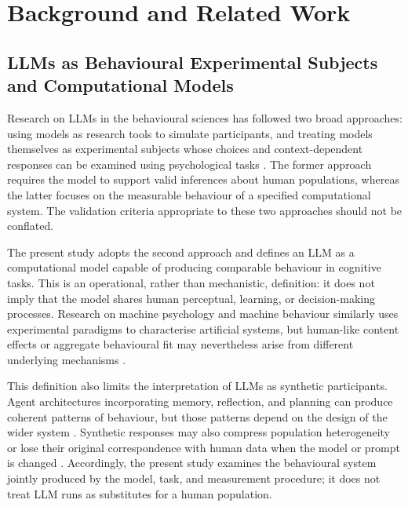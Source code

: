 \section{Background and Related Work}

\subsection{LLMs as Behavioural Experimental Subjects and Computational Models}

Research on LLMs in the behavioural sciences has followed two broad approaches: using models as research tools to simulate participants, and treating models themselves as experimental subjects whose choices and context-dependent responses can be examined using psychological tasks \cite{Dillion2023ReplaceParticipants,Hagendorff2023MachinePsychology,Rahwan2019MachineBehaviour}. The former approach requires the model to support valid inferences about human populations, whereas the latter focuses on the measurable behaviour of a specified computational system. The validation criteria appropriate to these two approaches should not be conflated.

The present study adopts the second approach and defines an LLM as a computational model capable of producing comparable behaviour in cognitive tasks. This is an operational, rather than mechanistic, definition: it does not imply that the model shares human perceptual, learning, or decision-making processes. Research on machine psychology and machine behaviour similarly uses experimental paradigms to characterise artificial systems, but human-like content effects or aggregate behavioural fit may nevertheless arise from different underlying mechanisms \cite{Rahwan2019MachineBehaviour,Lampinen2024ContentEffects,Lin2025SixFallacies}.

This definition also limits the interpretation of LLMs as synthetic participants. Agent architectures incorporating memory, reflection, and planning can produce coherent patterns of behaviour, but those patterns depend on the design of the wider system \cite{Park2023GenerativeAgents}. Synthetic responses may also compress population heterogeneity or lose their original correspondence with human data when the model or prompt is changed \cite{Dillion2023ReplaceParticipants,Bisbee2024SyntheticSurveyData}. Accordingly, the present study examines the behavioural system jointly produced by the model, task, and measurement procedure; it does not treat LLM runs as substitutes for a human population.

